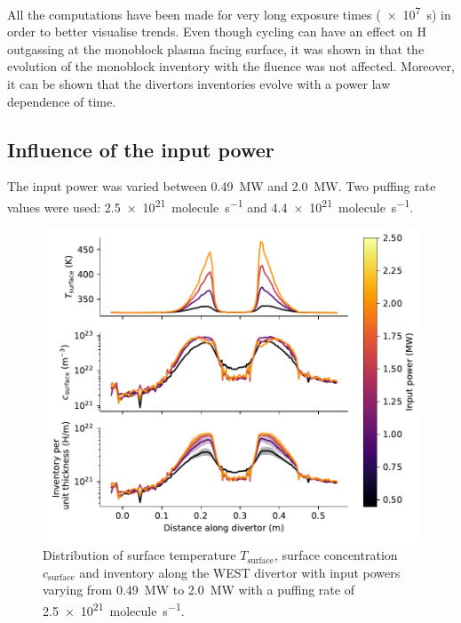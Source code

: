 All the computations have been made for very long exposure times (\SI{e7}{s}) in order to better visualise trends.
Even though cycling can have an effect on H outgassing at the monoblock plasma facing surface, it was shown in  that the evolution of the monoblock inventory with the fluence was not affected.
Moreover, it can be shown that the divertors inventories evolve with a power law dependence of time.

\subsection{Influence of the input power}

The input power was varied between \SI{0.49}{MW} and \SI{2.0}{MW}.
Two puffing rate values were used: \SI{2.5e21}{molecule.s^{-1}} and \SI{4.4e21}{molecule.s^{-1}}.

\begin{figure}[h]
    \centering
    \includegraphics[width=\linewidth]{Figures/Chapter4/WEST/inventory_along_divertor_input_power.pdf}
    \caption{Distribution of surface temperature $T_\mathrm{surface}$, surface concentration $c_\mathrm{surface}$ and inventory along the WEST divertor with input powers varying from \SI{0.49}{MW} to \SI{2.0}{MW} with a puffing rate of \SI{2.5e21}{molecule.s^{-1}}.}
    \label{fig:divertor distr power scan}
\end{figure}

